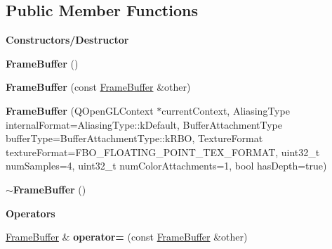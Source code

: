 \subsection*{Public Member Functions}
\begin{Indent}\textbf{ Constructors/\+Destructor}\par
\begin{DoxyCompactItemize}
\item 
\mbox{\label{classrev_1_1_frame_buffer_adcb1a0352f10ae5086411d0222216e6c}} 
{\bfseries Frame\+Buffer} ()
\item 
\mbox{\label{classrev_1_1_frame_buffer_a0bf5be7b1798d2d9daade2792a60fa28}} 
{\bfseries Frame\+Buffer} (const \mbox{\hyperlink{classrev_1_1_frame_buffer}{Frame\+Buffer}} \&other)
\item 
\mbox{\label{classrev_1_1_frame_buffer_a03b2f6afff4ffeefdea3bcfc83482060}} 
{\bfseries Frame\+Buffer} (Q\+Open\+G\+L\+Context $\ast$current\+Context, Aliasing\+Type internal\+Format=Aliasing\+Type\+::k\+Default, Buffer\+Attachment\+Type buffer\+Type=Buffer\+Attachment\+Type\+::k\+R\+BO, Texture\+Format texture\+Format=F\+B\+O\+\_\+\+F\+L\+O\+A\+T\+I\+N\+G\+\_\+\+P\+O\+I\+N\+T\+\_\+\+T\+E\+X\+\_\+\+F\+O\+R\+M\+AT, uint32\+\_\+t num\+Samples=4, uint32\+\_\+t num\+Color\+Attachments=1, bool has\+Depth=true)
\item 
\mbox{\label{classrev_1_1_frame_buffer_afa775e3abaa15cc524eb9d52bb200aaf}} 
{\bfseries $\sim$\+Frame\+Buffer} ()
\end{DoxyCompactItemize}
\end{Indent}
\begin{Indent}\textbf{ Operators}\par
\begin{DoxyCompactItemize}
\item 
\mbox{\label{classrev_1_1_frame_buffer_acaef914428db4693e1945d4bb1bb1bdf}} 
\mbox{\hyperlink{classrev_1_1_frame_buffer}{Frame\+Buffer}} \& {\bfseries operator=} (const \mbox{\hyperlink{classrev_1_1_frame_buffer}{Frame\+Buffer}} \&other)
\end{DoxyCompactItemize}
\end{Indent}

